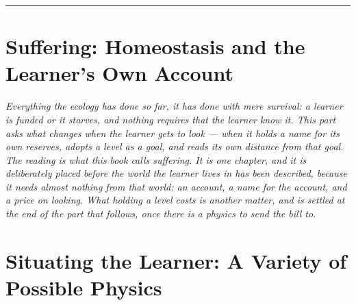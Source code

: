 \documentclass[12pt,openright,twoside]{book}
\theoremstyle{remark}
\theoremstyle{plain}
\theoremstyle{remark}
\theoremstyle{plain}
\theoremstyle{plain}
\begin{document}
\bigskip
\noindent\hrule
\bigskip


\part{Suffering: Homeostasis and the Learner's Own Account}
\label{part:choice}

\vspace{1em}
\begin{mdframed}[backgroundcolor=remarkgray, linecolor=gray!60,
                 linewidth=1pt, topline=false, rightline=false,
                 bottomline=false]
\small\itshape
Everything the ecology has done so far, it has done with mere survival: a
learner is funded or it starves, and nothing requires that the learner
know it.
This part asks what changes when the learner gets to look --- when it
holds a name for its own reserves, adopts a level as a goal, and reads
its own distance from that goal.
The reading is what this book calls suffering.
It is one chapter, and it is deliberately placed before the world the
learner lives in has been described, because it needs almost nothing from
that world: an account, a name for the account, and a price on looking.
What holding a level \emph{costs} is another matter, and is settled at the
end of the part that follows, once there is a physics to send the bill
to.
\end{mdframed}

\bigskip


\part{Situating the Learner: A Variety of Possible Physics}
\label{part:physics}
\end{document}
